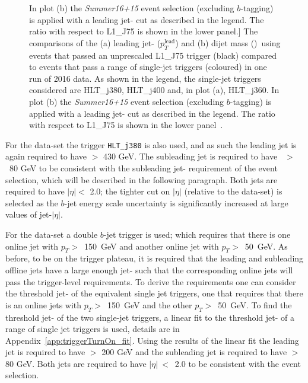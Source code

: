\begin{figure}[!ht]
            In plot (b) the \textit{Summer16+15} event selection (excluding $b$-tagging) is applied with a leading jet-\pT{} cut as described in the legend.
            The ratio with respect to L1\_J75 is shown in the lower panel.]
          {The comparisons of the (a) leading jet-\pT{} ($p_T^{\text{lead}}$) and (b) dijet mass (\mjj{})~using events that passed an
            unprescaled L1\_J75 trigger (black) compared to events that pass a range of single-jet triggers (coloured) in one run of 2016 data.
            As shown in the legend, the single-jet triggers considered are HLT\_j380, HLT\_j400 and, in plot (a), HLT\_j360.
            In plot (b) the \textit{Summer16+15} event selection (excluding $b$-tagging) is applied with a leading jet-\pT{} cut as described in the legend.
            The ratio with respect to L1\_J75 is shown in the lower panel~\cite{dibjet-ichep_conf}.}
     \label{fig:evt-ICHEP_turnon}
\end{figure}

For the \hm{} data-set the trigger \verb|HLT_j380| is also used,
and as such the leading jet is again required to have \pT{} $>$ 430 GeV.
The subleading jet is required to have \pT{}~$>$~80 GeV to be consistent with the subleading jet-\pT{} requirement of the \lm{} event selection,
which will be described in the following paragraph.
Both jets  are required to have $|\eta| <$ 2.0;
the tighter cut on $|\eta|$ (relative to the \summer{} data-set) is selected as the
$b$-jet energy scale uncertainty is significantly increased at large values of jet-$|\eta|$.

For the \lm{} data-set a double $b$-jet trigger is used;
which requires that there is one online jet with $p_T >$~150~GeV and another online jet with $p_T >$~50~GeV.
As before, to be on the trigger plateau, it is required that the leading and subleading offline jets
have a large enough jet-\pT{} such that the corresponding online jets will pass the trigger-level \pT{} requirements.
To derive the \pT{} requirements one can consider the threshold jet-\pT{} of the equivalent single jet triggers,
one that requires that there is an online jets with $p_T >$~150~GeV and the other $p_T >$~50~GeV.
To find the threshold jet-\pT{} of the two single-jet triggers,
a linear fit to the threshold jet-\pT{} of a range of single jet triggers is used,
details are in Appendix~\ref{app:triggerTurnOn_fit}.
Using the results of the linear fit the leading jet is required to have \pT{} $>$ 200 GeV
and the subleading jet is required to have \pT{} $>$ 80 GeV.
Both jets  are required to have $|\eta|~<$~2.0 to be consistent with the \hm{} event selection.


